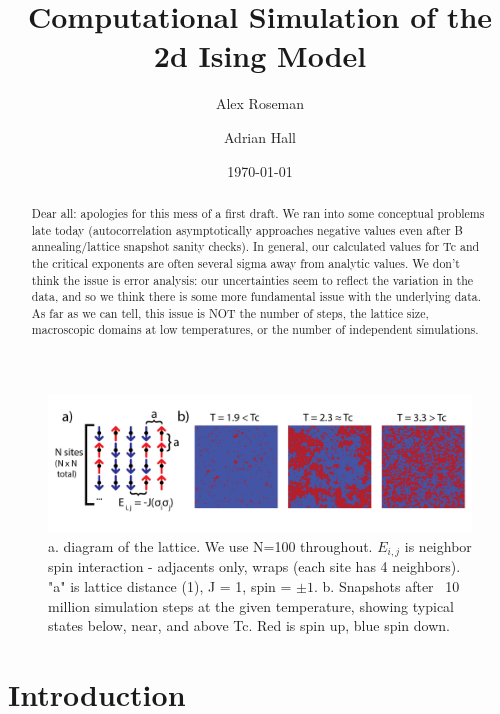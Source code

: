 \documentclass[letter,scriptaddress,twocolumn, prl]{revtex4}
\begin{document}
\title{Computational Simulation of the 2d Ising Model}

\author{Alex Roseman}
\author{Adrian Hall}
\date{\today}

\begin{abstract}
Dear all: apologies for this mess of a first draft. We ran into some conceptual problems late today (autocorrelation asymptotically approaches negative values even after B annealing/lattice snapshot sanity checks). In general, our calculated values for Tc and the critical exponents are often several sigma away from analytic values. We don't think the issue is error analysis: our uncertainties seem to reflect the variation in the data, and so we think there is some more fundamental issue with the underlying data. As far as we can tell, this issue is NOT the number of steps, the lattice size, macroscopic domains at low temperatures, or the number of independent simulations.
\end{abstract}

\maketitle

\begin{figure}[t]
	\begin{center}
		\includegraphics[width=1\textwidth]{figs/fig1.png}
		\caption{a. diagram of the lattice. We use N=100 throughout. $E_{i, j}$ is neighbor spin interaction - adjacents only, wraps (each site has 4 neighbors). "a" is lattice distance (1), J = 1, spin = $\pm 1$. b. Snapshots after ~10 million simulation steps at the given temperature, showing typical states below, near, and above Tc. Red is spin up, blue spin down.}
		\label{fig:fig1}
	\end{center}
\end{figure}

\section{Introduction}
\end{document}
